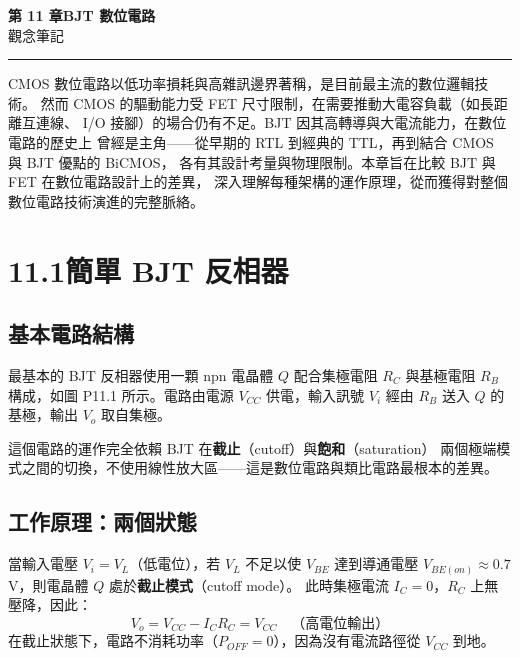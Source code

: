 \documentclass[12pt]{article}
\begin{document}
\begin{center}
{\Huge\bfseries\color{maincol} 第 11 章\quad BJT 數位電路}\\[0.5em]
{\large\color{keycol} 觀念筆記}
\end{center}
\vspace{0.4em}\hrule\vspace{1.2em}

\noindent
CMOS 數位電路以低功率損耗與高雜訊邊界著稱，是目前最主流的數位邏輯技術。
然而 CMOS 的驅動能力受 FET 尺寸限制，在需要推動大電容負載（如長距離互連線、
I/O 接腳）的場合仍有不足。BJT 因其高轉導與大電流能力，在數位電路的歷史上
曾經是主角——從早期的 RTL 到經典的 TTL，再到結合 CMOS 與 BJT 優點的 BiCMOS，
各有其設計考量與物理限制。本章旨在比較 BJT 與 FET 在數位電路設計上的差異，
深入理解每種架構的運作原理，從而獲得對整個數位電路技術演進的完整脈絡。

\section*{11.1\quad 簡單 BJT 反相器}

\subsection*{基本電路結構}

\begin{minipage}{0.62\linewidth}
最基本的 BJT 反相器使用一顆 npn 電晶體 $Q$ 配合集極電阻 $R_C$ 與基極電阻 $R_B$
構成，如圖 P11.1 所示。電路由電源 $V_{CC}$ 供電，輸入訊號 $V_i$ 經由 $R_B$ 送入
$Q$ 的基極，輸出 $V_o$ 取自集極。

這個電路的運作完全依賴 BJT 在\textbf{截止}（cutoff）與\textbf{飽和}（saturation）
兩個極端模式之間的切換，不使用線性放大區——這是數位電路與類比電路最根本的差異。
\end{minipage}\hfill
\begin{minipage}{0.34\linewidth}
\end{minipage}

\subsection*{工作原理：兩個狀態}

\begin{keybox}[截止模式（$V_i = V_L$）]
當輸入電壓 $V_i = V_L$（低電位），若 $V_L$ 不足以使 $V_{BE}$ 達到導通電壓
$V_{BE(on)} \approx 0.7$ V，則電晶體 $Q$ 處於\textbf{截止模式}（cutoff mode）。
此時集極電流 $I_C = 0$，$R_C$ 上無壓降，因此：
\[
V_o = V_{CC} - I_C R_C = V_{CC} \quad \text{（高電位輸出）}
\]
在截止狀態下，電路不消耗功率（$P_{OFF} = 0$），因為沒有電流路徑從 $V_{CC}$ 到地。
\end{keybox}
\end{document}
